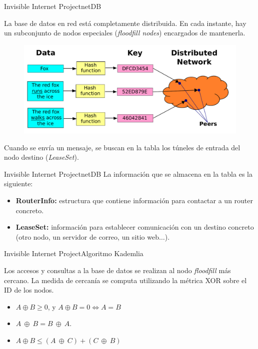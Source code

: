 \documentclass[spanish]{beamer}
\begin{document}
\begin{frame}{Invisible Internet Project}{netDB}

La base de datos en red está completamente distribuida. En cada instante, hay un subconjunto de nodos especiales (\textit{floodfill nodes}) encargados de mantenerla.\\

\begin{figure}
	\centering
	\includegraphics[width=.6\textwidth]{img/DHT.pdf}
\end{figure}

Cuando se envía un mensaje, se buscan en la tabla los túneles de entrada del nodo destino (\textit{LeaseSet}).
\end{frame}

\begin{frame}{Invisible Internet Project}{netDB}
	La información que se almacena en la tabla es la siguiente:
	\vspace{1.5em}
	
	\begin{itemize}
	\item \textbf{RouterInfo:} estructura que contiene información para contactar a un router concreto.
	\item \textbf{LeaseSet:} información para establecer comunicación con un destino concreto (otro nodo, un servidor de correo, un sitio web$\dots$).
\end{itemize}
\end{frame}

\begin{frame}{Invisible Internet Project}{Algoritmo Kademlia}

Los accesos y consultas a la base de datos se realizan al nodo \textit{floodfill} más cercano. La medida de cercanía se computa utilizando la métrica XOR sobre el ID de los nodos.

\vspace{1.5em}
\begin{itemize}
	\item $A \oplus B \ge 0$, y $A \oplus B = 0 \iff A = B$ 
	\item $A \ \oplus \ B = B \ \oplus \ A$.
	\item $A \oplus B \leq (A \ \oplus \ C) + (C \ \oplus \ B)$
\end{itemize}
	
\end{frame}
\end{document}
